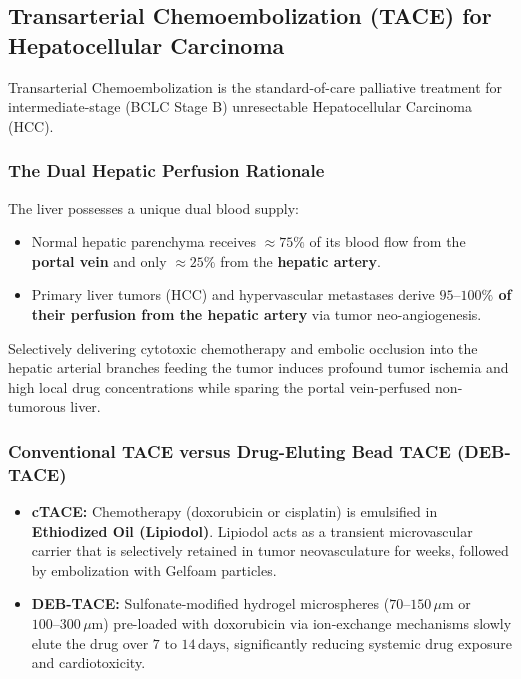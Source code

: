 \documentclass[11pt,a4paper]{article}
\begin{document}
\subsection{Transarterial Chemoembolization (TACE) for Hepatocellular Carcinoma}

Transarterial Chemoembolization is the standard-of-care palliative treatment for intermediate-stage (BCLC Stage B) unresectable Hepatocellular Carcinoma (HCC).

\subsubsection{The Dual Hepatic Perfusion Rationale}
The liver possesses a unique dual blood supply:
\begin{itemize}[leftmargin=*]
    \item Normal hepatic parenchyma receives $\approx 75\%$ of its blood flow from the \textbf{portal vein} and only $\approx 25\%$ from the \textbf{hepatic artery}.
    \item Primary liver tumors (HCC) and hypervascular metastases derive \textbf{$95\text{--}100\%$ of their perfusion from the hepatic artery} via tumor neo-angiogenesis.
\end{itemize}
Selectively delivering cytotoxic chemotherapy and embolic occlusion into the hepatic arterial branches feeding the tumor induces profound tumor ischemia and high local drug concentrations while sparing the portal vein-perfused non-tumorous liver.

\subsubsection{Conventional TACE versus Drug-Eluting Bead TACE (DEB-TACE)}
\begin{itemize}[leftmargin=*]
    \item \textbf{cTACE:} Chemotherapy (doxorubicin or cisplatin) is emulsified in \textbf{Ethiodized Oil (Lipiodol)}. Lipiodol acts as a transient microvascular carrier that is selectively retained in tumor neovasculature for weeks, followed by embolization with Gelfoam particles.
    \item \textbf{DEB-TACE:} Sulfonate-modified hydrogel microspheres ($70\text{--}150\,\mu\text{m}$ or $100\text{--}300\,\mu\text{m}$) pre-loaded with doxorubicin via ion-exchange mechanisms slowly elute the drug over $7\text{ to }14\,\text{days}$, significantly reducing systemic drug exposure and cardiotoxicity.
\end{itemize}
\end{document}
